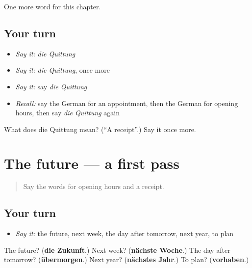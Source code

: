 \begin{grammarlens}[title={What you've built}]
One more word for this chapter.
\end{grammarlens}

\subsection*{Your turn}
\begin{itemize}
\raggedright
  \item \emph{Say it:} \emph{die Quittung}
  \item \emph{Say it:} \emph{die Quittung}, once more
  \item \emph{Say it:} say \emph{die Quittung}
  \item \emph{Recall:} say the German for an appointment, then the German for opening hours, then say \emph{die Quittung} again
\end{itemize}

\begin{tcolorbox}[breakable,colback=teal!4,colframe=teal!35!black,title={Before you move on}]
What does die Quittung mean? (\textquotedblleft{}A receipt\textquotedblright{}.) Say it once more.
\end{tcolorbox}
\section[(dialogue)]{The future — a first pass}

\label{lesson:GE-R143-first-pass-the-future}



\begin{quote}
Say the words for opening hours and a receipt.
\end{quote}

\subsection*{Your turn}
\begin{itemize}
\raggedright
  \item \emph{Say it:} the future, next week, the day after tomorrow, next year, to plan
\end{itemize}

\begin{tcolorbox}[breakable,colback=teal!4,colframe=teal!35!black,title={Before you move on}]
The future? (\textbf{die Zukunft}.) Next week? (\textbf{nächste Woche}.) The day after tomorrow? (\textbf{übermorgen}.) Next year? (\textbf{nächstes Jahr}.) To plan? (\textbf{vorhaben}.)
\end{tcolorbox}
